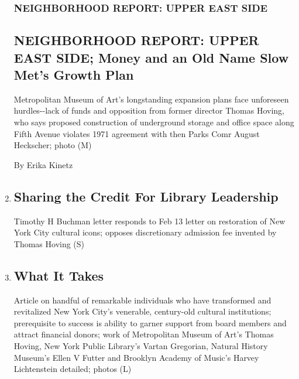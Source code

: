 \begin{enumerate}
  \hypertarget{neighborhood-report-upper-east-side}{%
  \subsubsection{NEIGHBORHOOD REPORT: UPPER EAST
  SIDE}\label{neighborhood-report-upper-east-side}}

  \hypertarget{neighborhood-report-upper-east-side-money-and-an-old-name-slow-mets-growth-plan}{%
  \subsection{NEIGHBORHOOD REPORT: UPPER EAST SIDE; Money and an Old
  Name Slow Met's Growth
  Plan}\label{neighborhood-report-upper-east-side-money-and-an-old-name-slow-mets-growth-plan}}

  Metropolitan Museum of Art's longstanding expansion plans face
  unforeseen hurdles-\/-lack of funds and opposition from former
  director Thomas Hoving, who says proposed construction of underground
  storage and office space along Fifth Avenue violates 1971 agreement
  with then Parks Comr August Heckscher; photo (M)

  By Erika Kinetz
\item
  \href{/2000/02/27/nyregion/l-sharing-the-credit-for-library-leadership-010600.html}{}

  \hypertarget{sharing-the-credit-for-library-leadership}{%
  \subsection{Sharing the Credit For Library
  Leadership}\label{sharing-the-credit-for-library-leadership}}

  Timothy H Buchman letter responds to Feb 13 letter on restoration of
  New York City cultural icons; opposes discretionary admission fee
  invented by Thomas Hoving (S)
\item
  \href{/2000/02/13/nyregion/what-it-takes.html}{}

  \hypertarget{what-it-takes}{%
  \subsection{What It Takes}\label{what-it-takes}}

  Article on handful of remarkable individuals who have transformed and
  revitalized New York City's venerable, century-old cultural
  institutions; prerequisite to success is ability to garner support
  from board members and attract financial donors; work of Metropolitan
  Museum of Art's Thomas Hoving, New York Public Library's Vartan
  Gregorian, Natural History Museum's Ellen V Futter and Brooklyn
  Academy of Music's Harvey Lichtenstein detailed; photos (L)


\end{enumerate}
